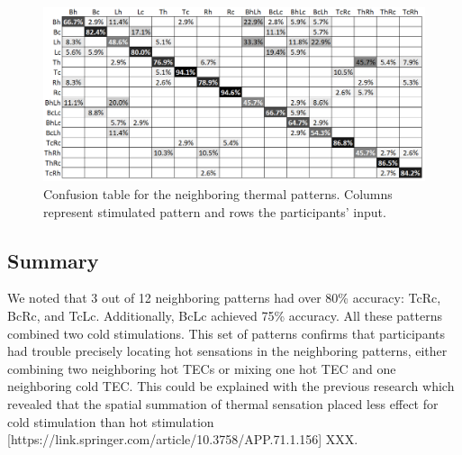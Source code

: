 \documentclass[preprint,12pt]{elsarticle}
\begin{document}
\begin{figure}[tp]
  \centering
  \includegraphics[width=0.9\columnwidth]{img/fig11.png}
  \caption{Confusion table for the neighboring thermal patterns. Columns represent stimulated pattern and rows the participants' input.}
  \label{fig:11}
\end{figure}

\subsection{Summary}
We noted that 3 out of 12 neighboring patterns had over 80\% accuracy: TcRc, BcRc, and TcLc. Additionally, BcLc achieved 75\% accuracy. All these patterns combined two cold stimulations. This set of patterns confirms that participants had trouble precisely locating hot sensations in the neighboring patterns, either combining two neighboring hot TECs or mixing one hot TEC and one neighboring cold TEC. This could be explained with the previous research which revealed that the spatial summation of thermal sensation placed less effect for cold stimulation than hot stimulation [https://link.springer.com/article/10.3758/APP.71.1.156] XXX.



\end{document}
